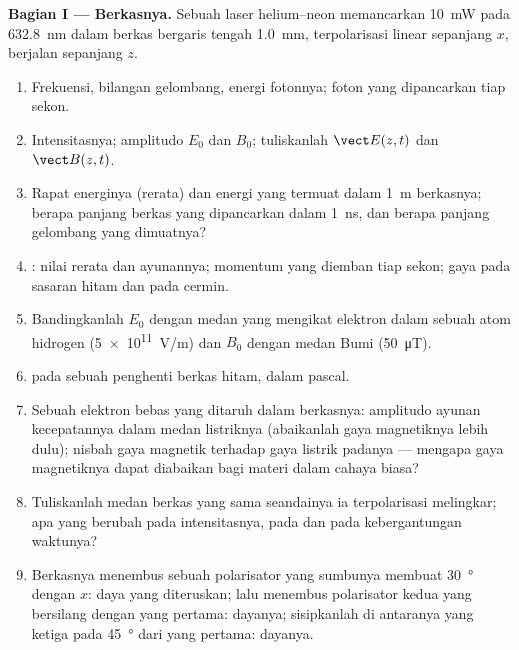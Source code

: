\begin{problem}
\label{pb:b2:plane-waves-polarization:1}

\medskip
\noindent\textbf{Bagian I --- Berkasnya.}
Sebuah laser helium--neon memancarkan \qty{10}{mW} pada \qty{632.8}{nm} dalam berkas
bergaris tengah \qty{1.0}{mm}, terpolarisasi linear sepanjang $x$, berjalan sepanjang
$z$.
\begin{enumerate}
  \item Frekuensi, bilangan gelombang, energi fotonnya; foton yang dipancarkan tiap
        sekon.
  \item Intensitasnya; amplitudo $E_0$ dan $B_0$; tuliskanlah $\vect E(z, t)$ dan
        $\vect B(z, t)$.
  \item Rapat energinya (rerata) dan energi yang termuat dalam \qty{1}{m}
        berkasnya; berapa panjang berkas yang dipancarkan dalam \qty{1}{ns}, dan berapa
        panjang gelombang yang dimuatnya?
  \item {}: nilai rerata dan ayunannya; momentum
        yang diemban tiap sekon; gaya pada sasaran hitam dan pada cermin.
  \item Bandingkanlah $E_0$ dengan medan yang mengikat elektron dalam sebuah
        atom hidrogen (\qty{5e11}{V/m}) dan $B_0$ dengan medan Bumi
        (\qty{50}{\micro T}).
  \item {} pada sebuah penghenti berkas hitam, dalam pascal.
  \item Sebuah elektron bebas yang ditaruh dalam berkasnya: amplitudo ayunan
        kecepatannya dalam medan listriknya (abaikanlah gaya magnetiknya
        lebih dulu); nisbah gaya magnetik terhadap gaya listrik padanya ---
        mengapa gaya magnetiknya dapat diabaikan bagi materi dalam cahaya
        biasa?
  \item Tuliskanlah medan berkas yang sama seandainya ia terpolarisasi
        melingkar; apa yang berubah pada intensitasnya, pada 
        dan pada kebergantungan waktunya?
  \item Berkasnya menembus sebuah polarisator yang sumbunya membuat
        \qty{30}{\degree} dengan $x$: daya yang diteruskan; lalu menembus polarisator
        kedua yang bersilang dengan yang pertama: dayanya; sisipkanlah di antaranya
        yang ketiga pada \qty{45}{\degree} dari yang pertama: dayanya.
\end{enumerate}


\end{problem}
